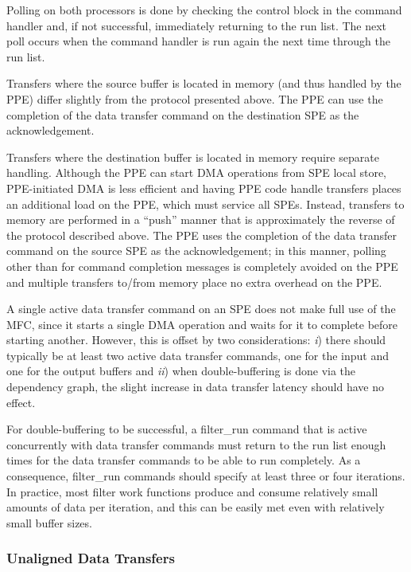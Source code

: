 Polling on both processors is done by checking the control block in the command handler and, if not successful, immediately returning to the run list. The next poll occurs when the command handler is run again the next time through the run list.

Transfers where the source buffer is located in memory (and thus handled by the PPE) differ slightly from the protocol presented above. The PPE can use the completion of the data transfer command on the destination SPE as the acknowledgement.

Transfers where the destination buffer is located in memory require separate handling. Although the PPE can start DMA operations from SPE local store, PPE-initiated DMA is less efficient and having PPE code handle transfers places an additional load on the PPE, which must service all SPEs. Instead, transfers to memory are performed in a ``push'' manner that is approximately the reverse of the protocol described above. The PPE uses the completion of the data transfer command on the source SPE as the acknowledgement; in this manner, polling other than for command completion messages is completely avoided on the PPE and multiple transfers to/from memory place no extra overhead on the PPE.

A single active data transfer command on an SPE does not make full use of the MFC, since it starts a single DMA operation and waits for it to complete before starting another. However, this is offset by two considerations: \emph{i}) there should typically be at least two active data transfer commands, one for the input and one for the output buffers and \emph{ii}) when double-buffering is done via the dependency graph, the slight increase in data transfer latency should have no effect.

For double-buffering to be successful, a \textsf{filter\_run} command that is active concurrently with data transfer commands must return to the run list enough times for the data transfer commands to be able to run completely. As a consequence, \textsf{filter\_run} commands should specify at least three or four iterations. In practice, most filter work functions produce and consume relatively small amounts of data per iteration, and this can be easily met even with relatively small buffer sizes.

\subsubsection{Unaligned Data Transfers}


